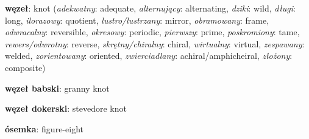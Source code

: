 \item \textbf{węzeł}: knot
(\emph{adekwatny}: adequate, \emph{alternujący}: alternating, \emph{dziki}: wild, \emph{długi}: long, \emph{ilorazowy}: quotient, \emph{lustro/lustrzany}: mirror, \emph{obramowany}: frame, \emph{odwracalny}: reversible, \emph{okresowy}: periodic, \emph{pierwszy}: prime, \emph{poskromiony}: tame, \emph{rewers/odwrotny}: reverse, \emph{skrętny/chiralny}: chiral, \emph{wirtualny}: virtual, \emph{zespawany}: welded, \emph{zorientowany}: oriented, \emph{zwierciadlany}: achiral/amphicheiral, \emph{złożony}: composite)
\item \textbf{węzeł babski}: granny knot
\item \textbf{węzeł dokerski}: stevedore knot
\item \textbf{ósemka}: figure-eight
